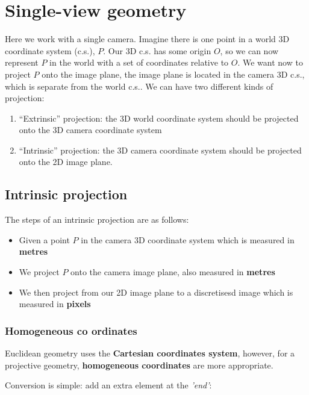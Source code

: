 \documentclass{article}
\begin{document}
\section{Single-view geometry}
\label{sec:singleview}

Here we work with a single camera. Imagine there is one point in a world 3D coordinate system (c.s.), $P$. Our 3D c.s. has some origin $O$, so we can now represent $P$ in the world with a set of coordinates relative to $O$. We want now to project $P$ onto the image plane, the image plane is located in the camera 3D c.s., which is separate from the world c.s.. We can have two different kinds of projection:

\begin{enumerate}
  \item ``Extrinsic'' projection: the 3D world coordinate system should be projected onto the 3D camera coordinate system
  \item ``Intrinsic'' projection: the 3D camera coordinate system should be projected onto the 2D image plane.
\end{enumerate}

\subsection{Intrinsic projection}
\label{subsec:intrinsic-projection}

The steps of an intrinsic projection are as follows:

\begin{itemize}
  \item Given a point $P$ in the camera 3D coordinate system which is measured in \textbf{metres}
  \item We project $P$ onto the camera image plane, also measured in \textbf{metres}
  \item We then project from our 2D image plane to a discretisesd image which is measured in \textbf{pixels}
\end{itemize}

\subsubsection{Homogeneous co ordinates}

Euclidean geometry uses the \textbf{Cartesian coordinates system}, however, for a projective geometry, \textbf{homogeneous coordinates} are more appropriate.

Conversion is simple: add an extra element at the \textit{'end'}:
\end{document}
